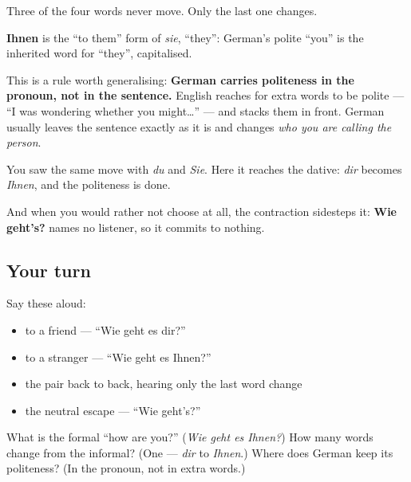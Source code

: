 Three of the four words never move. Only the last one changes.

\begin{cousinweb}
\textbf{Ihnen} is the \textquotedblleft{}to them\textquotedblright{} form of \emph{sie}, \textquotedblleft{}they\textquotedblright{}: German's polite \textquotedblleft{}you\textquotedblright{} is the inherited word for \textquotedblleft{}they\textquotedblright{}, capitalised.
\end{cousinweb}

\begin{grammarlens}[title={Grammar Lens: politeness lives in the pronoun}]
This is a rule worth generalising: \textbf{German carries politeness in the pronoun, not in the sentence.} English reaches for extra words to be polite — \textquotedblleft{}I was wondering whether you might…\textquotedblright{} — and stacks them in front. German usually leaves the sentence exactly as it is and changes \emph{who you are calling the person}.

You saw the same move with \emph{du} and \emph{Sie}. Here it reaches the dative: \emph{dir} becomes \emph{Ihnen}, and the politeness is done.

And when you would rather not choose at all, the contraction sidesteps it: \textbf{Wie geht's?} names no listener, so it commits to nothing.
\end{grammarlens}

\subsection*{Your turn}
Say these aloud:

\begin{itemize}
\raggedright
  \item to a friend — \textquotedblleft{}Wie geht es dir?\textquotedblright{}
  \item to a stranger — \textquotedblleft{}Wie geht es Ihnen?\textquotedblright{}
  \item the pair back to back, hearing only the last word change
  \item the neutral escape — \textquotedblleft{}Wie geht's?\textquotedblright{}
\end{itemize}

\begin{tcolorbox}[breakable,colback=teal!4,colframe=teal!35!black,title={Before you move on}]
What is the formal \textquotedblleft{}how are you?\textquotedblright{} (\emph{Wie geht es Ihnen?}) How many words change from the informal? (One — \emph{dir} to \emph{Ihnen}.) Where does German keep its politeness? (In the pronoun, not in extra words.)
\end{tcolorbox}
